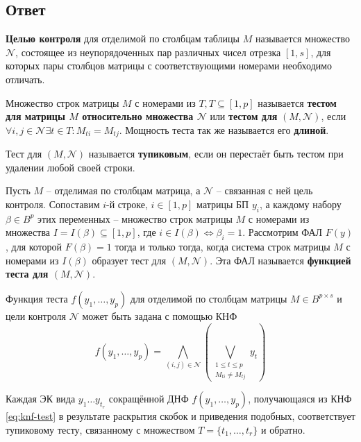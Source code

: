 \documentclass[11pt]{article}
\newcounter{Def}\setcounter{Def}{0}
\def\df{\par\smallskip\refstepcounter{Def}\textbf{\arabic{Def}}}
\newtheorem*{Def}{Определение \df}
\newcounter{lem}\setcounter{lem}{0}
\def\lm{\par\smallskip\refstepcounter{lem}\textbf{\arabic{lem}}}
\newtheorem*{Lemma}{Лемма \lm}
\newcounter{th}\setcounter{th}{0}
\newcounter{cnsqnc}\setcounter{cnsqnc}{0}
\def\cnsqnc{\par\smallskip\refstepcounter{cnsqnc}\textbf{\arabic{cnsqnc}}}
\newtheorem*{Consequence}{Следствие \cnsqnc}
\begin{document}
\subsection{Ответ}
\label{sec:orgabf4ce5}
   \begin{Def}
    \textbf{Целью контроля} для отделимой по столбцам таблицы $M$ называется множество $\mathcal{N}$, состоящее из неупорядоченных пар различных чисел отрезка $[1, s]$, для которых пары столбцов матрицы с соответствующими номерами необходимо отличать.
\end{Def}
\begin{Def}
    Множество строк матрицы $M$ с номерами из $T, T \subseteq [1, p]$ называется \textbf{тестом для матрицы $M$ относительно множества $\mathcal{N}$} или \textbf{тестом для} $(M, \mathcal{N})$, если $\forall i, j \in \mathcal{N} \exists t \in T: M_{ti} = M_{tj}$. Мощность теста так же называется его \textbf{длиной}.
\end{Def}
\begin{Def}
    Тест для $(M, \mathcal{N})$ называется \textbf{тупиковым}, если он перестаёт быть тестом при удалении любой своей строки.
\end{Def}
\begin{Def}
    Пусть $M$ -- отделимая по столбцам матрица, а $\mathcal{N}$ -- связанная с ней цель контроля. Сопоставим $i$-й строке, $i \in [1, p]$ матрицы БП $y_i$, а каждому набору $\beta \in B^p$ этих переменных -- множество строк матрицы $M$ с номерами из множества $I = I(\beta) \subseteq [1, p]$, где $i \in I(\beta) \Leftrightarrow \beta_i = 1$. Рассмотрим ФАЛ $F(y)$, для которой $F(\beta) = 1$ тогда и только тогда, когда система строк матрицы $M$ с номерами из $I(\beta)$ образует тест для $(M, \mathcal{N})$. Эта ФАЛ называется \textbf{функцией теста для $(M, \mathcal{N})$}.
\end{Def}
\begin{Lemma}
    Функция теста $f(y_1, \ldots, y_p)$ для отделимой по столбцам матрицы $M \in B^{p\times s}$ и цели контроля $\mathcal{N}$ может быть задана с помощью КНФ
    \begin{equation}\label{eq:knf-test}
        f(y_1, \ldots, y_p) = \bigwedge\limits_{(i, j) \in \mathcal{N}}\left(\bigvee\limits_{\substack{1 \leq t \leq p \\ M_{ti} \neq M_{tj}}}y_t\right)
    \end{equation}
\end{Lemma}
\begin{Consequence}
    Каждая ЭК вида $y_1\ldots y_{t_r}$ сокращённой ДНФ $f(y_1, \ldots, y_p)$, получающаяся из КНФ \eqref{eq:knf-test} в результате раскрытия скобок и приведения подобных, соответствует тупиковому тесту, связанному с множеством $T = \{t_1, \ldots, t_r\}$ и обратно.
\end{Consequence}
\pagebreak
\end{document}

